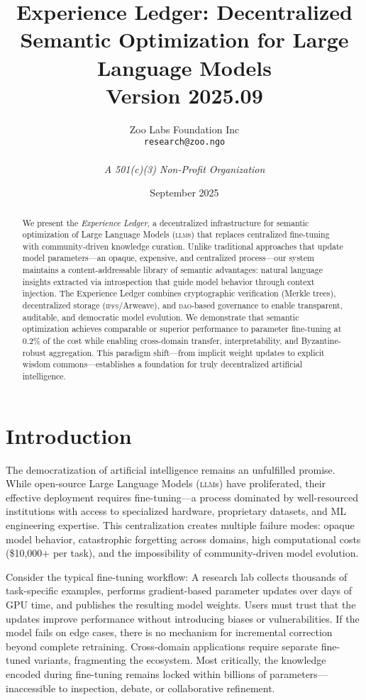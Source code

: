 \documentclass[11pt,letterpaper]{article}
\title{\textbf{Experience Ledger: Decentralized Semantic Optimization for Large Language Models}\\
\large Version 2025.09}
\author{
Zoo Labs Foundation Inc\\
\texttt{research@zoo.ngo}\\
\\
\textit{A 501(c)(3) Non-Profit Organization}
}
\date{September 2025}
\newcommand{\DAO}{\textsc{dao}}
\newcommand{\IPFS}{\textsc{ipfs}}
\newcommand{\LLM}{\textsc{llm}}
\begin{document}
\maketitle

\begin{abstract}
We present the \textit{Experience Ledger}, a decentralized infrastructure for semantic optimization of Large Language Models (\LLM{}s) that replaces centralized fine-tuning with community-driven knowledge curation. Unlike traditional approaches that update model parameters—an opaque, expensive, and centralized process—our system maintains a content-addressable library of semantic advantages: natural language insights extracted via introspection that guide model behavior through context injection. The Experience Ledger combines cryptographic verification (Merkle trees), decentralized storage (\IPFS{}/Arweave), and \DAO{}-based governance to enable transparent, auditable, and democratic model evolution. We demonstrate that semantic optimization achieves comparable or superior performance to parameter fine-tuning at 0.2\% of the cost while enabling cross-domain transfer, interpretability, and Byzantine-robust aggregation. This paradigm shift—from implicit weight updates to explicit wisdom commons—establishes a foundation for truly decentralized artificial intelligence.
\end{abstract}

\section{Introduction}

The democratization of artificial intelligence remains an unfulfilled promise. While open-source Large Language Models (\LLM{}s) have proliferated, their effective deployment requires fine-tuning—a process dominated by well-resourced institutions with access to specialized hardware, proprietary datasets, and ML engineering expertise. This centralization creates multiple failure modes: opaque model behavior, catastrophic forgetting across domains, high computational costs (\$10,000+ per task), and the impossibility of community-driven model evolution.

Consider the typical fine-tuning workflow: A research lab collects thousands of task-specific examples, performs gradient-based parameter updates over days of GPU time, and publishes the resulting model weights. Users must trust that the updates improve performance without introducing biases or vulnerabilities. If the model fails on edge cases, there is no mechanism for incremental correction beyond complete retraining. Cross-domain applications require separate fine-tuned variants, fragmenting the ecosystem. Most critically, the knowledge encoded during fine-tuning remains locked within billions of parameters—inaccessible to inspection, debate, or collaborative refinement.
\end{document}
